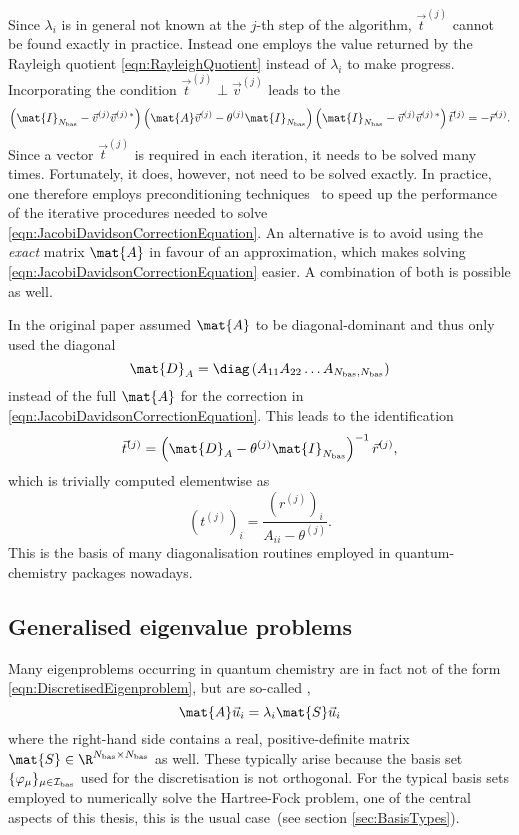 Since $\lambda_i$ is in general not known at the $j$-th step of the algorithm,
$\vec{t}^{(j)}$ cannot be found exactly in practice.
Instead one employs the value returned by the Rayleigh quotient
\eqref{eqn:RayleighQuotient}
instead of $\lambda_i$ to make progress.
Incorporating the condition $\vec{t}^{(j)} \perp \vec{v}^{(j)}$ leads to the
\begin{equation}
	\left(\mat{I}_{\Nbas} - \vec{v}^{(j)} \vec{v}^{(j)\,\ast} \right)
	\left(\mat{A} \vec{v}^{(j)} - \theta^{(j)} \mat{I}_{\Nbas}\right)
	\left(\mat{I}_{\Nbas} - \vec{v}^{(j)} \vec{v}^{(j)\,\ast}\right)
	\vec{t}^{(j)}
	= - \vec{r}^{(j)}.
	\label{eqn:JacobiDavidsonCorrectionEquation}
\end{equation}
Since a vector $\vec{t}^{(j)}$ is required
in each iteration, it needs to be solved many times.
Fortunately, it does, however, not need to be solved exactly.
In practice, one therefore
employs preconditioning techniques~\cite{Saad2003,Saad2011,Arbenz2010,Grossmann1992}
to speed up the performance of the iterative procedures
needed to solve \eqref{eqn:JacobiDavidsonCorrectionEquation}.
An alternative is to avoid using the \emph{exact} matrix $\mat{A}$
in favour of an approximation,
which makes solving \eqref{eqn:JacobiDavidsonCorrectionEquation} easier.
A combination of both is possible as well.

In the original paper \citet{Davidson1975}
assumed $\mat{A}$ to be diagonal-dominant
and thus only used the diagonal
\[ \mat{D}_A = \diag\left( A_{11} A_{22} \ldots A_{\Nbas,\Nbas} \right) \]
instead of the full $\mat{A}$
for the correction in \eqref{eqn:JacobiDavidsonCorrectionEquation}.
This leads to the identification
\[
	\vec{t}^{(j)} = \left( \mat{D}_A - \theta^{(j)} \mat{I}_{\Nbas} \right)^{-1} \vec{r}^{(j)},
\]
which is trivially computed elementwise as
\[
	\left(t^{(j)}\right)_i = \frac{\left(r^{(j)}\right)_i}{A_{ii} - \theta^{(j)}}.
\]
This is the basis of many diagonalisation routines
employed in quantum-chemistry packages nowadays.

\subsection{Generalised eigenvalue problems}
\label{sec:GeneralisedEigenvalueProblem}
Many eigenproblems occurring in quantum chemistry are in fact
not of the form \eqref{eqn:DiscretisedEigenproblem},
but are so-called ,
\begin{equation}
	\mat{A} \vec{u}_i = \lambda_i \mat{S} \vec{u}_i
	\label{eqn:GeneralisedEigenproblem}
\end{equation}
where the right-hand side contains a
real, positive-definite matrix $\mat{S} \in \R^{\Nbas\times\Nbas}$ as well.
These typically arise because the
basis set $\{\varphi_\mu\}_{\mu \in \mathcal{I}_\text{bas}}$
used for the discretisation is not orthogonal.
For the typical basis sets employed to numerically solve the Hartree-Fock
problem,
one of the central aspects of this thesis,
this is the usual case~(see section \vref{sec:BasisTypes}).


